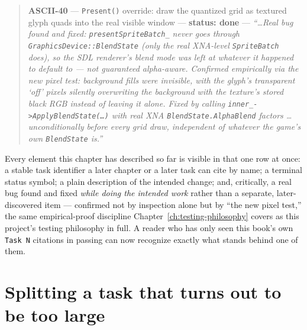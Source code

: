 \begin{quote}
\small
\textbf{ASCII-40} --- \texttt{Present()} override: draw the quantized grid as textured glyph
quads into the real visible window --- \textbf{status: done} --- \emph{``\ldots{}Real bug
found and fixed: \texttt{presentSpriteBatch\_} never goes through
\texttt{GraphicsDevice::BlendState} (only the real XNA-level \texttt{SpriteBatch} does), so the
SDL renderer's blend mode was left at whatever it happened to default to --- not guaranteed
alpha-aware. Confirmed empirically via the new pixel test: background fills were invisible, with
the glyph's transparent `off' pixels silently overwriting the background with the texture's
stored black RGB instead of leaving it alone. Fixed by calling
\texttt{inner\_->ApplyBlendState(\ldots{})} with real XNA \texttt{BlendState.AlphaBlend} factors
\ldots{} unconditionally before every grid draw, independent of whatever the game's own
\texttt{BlendState} is.''}
\end{quote}

Every element this chapter has described so far is visible in that one row at once: a stable
task identifier a later chapter or a later task can cite by name; a terminal status symbol; a
plain description of the intended change; and, critically, a real bug found and fixed
\emph{while doing the intended work} rather than a separate, later-discovered item --- confirmed
not by inspection alone but by ``the new pixel test,'' the same empirical-proof discipline
Chapter~\ref{ch:testing-philosophy} covers as this project's testing philosophy in full. A reader
who has only seen this book's own \texttt{Task~N} citations in passing can now recognize exactly
what stands behind one of them.

\section{Splitting a task that turns out to be too large}

